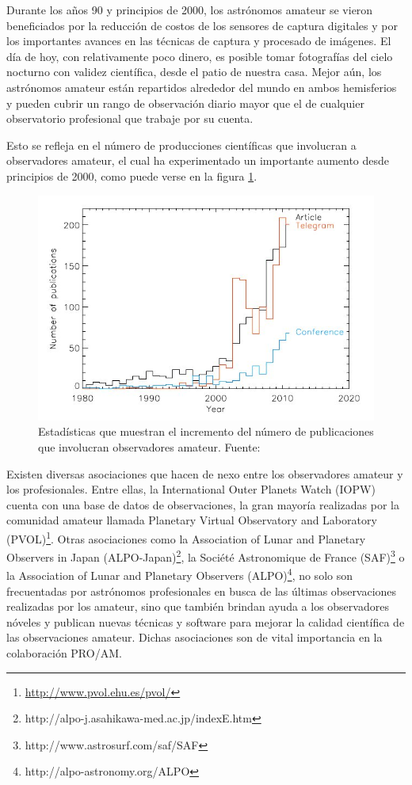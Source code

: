 \documentclass[a4paper,10pt]{article}
\begin{document}
Durante los años 90 y principios de 2000, los astrónomos amateur se vieron beneficiados 
por la reducción de costos de los sensores de captura digitales\cite{1} y por los 
importantes avances en las técnicas de captura y procesado de imágenes\cite{2}. El 
día de hoy, con relativamente poco dinero, es posible tomar fotografías del cielo 
nocturno con validez científica, desde el patio de nuestra casa. Mejor aún, los 
astrónomos amateur están repartidos alrededor del mundo en ambos hemisferios y pueden 
cubrir un rango de observación diario mayor que el de cualquier observatorio profesional 
que trabaje por su cuenta.

Esto se refleja en el número de producciones científicas que involucran a observadores 
amateur, el cual ha experimentado un importante aumento desde principios de 2000, como 
puede verse en la figura \ref{proam-plot}.

\begin{figure}[H]
\includegraphics[scale=0.65]{proam-plot.jpg}
\caption{Estadísticas que muestran el incremento del número de publicaciones que 
involucran observadores amateur. Fuente: \cite{3}}
\label{proam-plot}
\end{figure}

Existen diversas asociaciones que hacen de nexo entre los observadores amateur y los 
profesionales. Entre ellas, la International Outer Planets Watch (IOPW) cuenta con una 
base de datos de observaciones, la gran mayoría realizadas por la comunidad amateur 
llamada Planetary Virtual Observatory and Laboratory 
(PVOL)\footnote{\url{http://www.pvol.ehu.es/pvol/}}.
Otras asociaciones como la Association of Lunar and Planetary Observers in 
Japan (ALPO-Japan)\footnote{http://alpo-j.asahikawa-med.ac.jp/indexE.htm}, la Société 
Astronomique de France (SAF)\footnote{http://www.astrosurf.com/saf/SAF} o la Association 
of Lunar and Planetary Observers (ALPO)\footnote{http://alpo-astronomy.org/ALPO}, no solo 
son frecuentadas por astrónomos profesionales en busca de las últimas observaciones 
realizadas por los amateur, sino que también brindan ayuda a los observadores nóveles y 
publican nuevas técnicas y software para mejorar la calidad científica de las 
observaciones amateur. Dichas asociaciones son de vital importancia en la colaboración 
PRO/AM.
\end{document}

